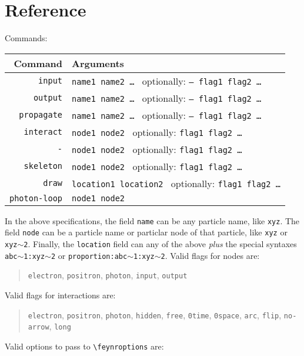 \documentclass[12pt]{article}
\begin{document}
\section*{Reference}
Commands:
\begin{center}
\begin{tabular}{r|l}
	Command & Arguments \\\hline
	\texttt{input} & \texttt{name1 name2 \dots} \ optionally: \texttt{-- flag1 flag2 \dots} \\
	\texttt{output} & \texttt{name1 name2 \dots} \ optionally: \texttt{-- flag1 flag2 \dots} \\
	\texttt{propagate} & \texttt{name1 name2 \dots} \ optionally: \texttt{-- flag1 flag2 \dots} \\
	\texttt{interact} & \texttt{node1 node2} \ optionally: \texttt{flag1 flag2 \dots} \\
	\texttt{-} & \texttt{node1 node2} \ optionally: \texttt{flag1 flag2 \dots} \\
	\texttt{skeleton} & \texttt{node1 node2} \ optionally: \texttt{flag1 flag2 \dots} \\
	\texttt{draw} & \texttt{location1 location2} \ optionally: \texttt{flag1 flag2 \dots} \\
	\texttt{photon-loop} & \texttt{node1 node2}
\end{tabular}
\end{center}
In the above specifications, the field \texttt{name} can be any particle name, like \texttt{xyz}.
The field \texttt{node} can be a particle name or particlar node of that particle, like \texttt{xyz} or \texttt{xyz$\sim$2}.
Finally, the \texttt{location} field can any of the above \emph{plus} the special syntaxes \texttt{abc$\sim$1:xyz$\sim$2} or \texttt{proportion:abc$\sim$1:xyz$\sim$2}.
Valid flags for nodes are:
\begin{quote}
\texttt{electron}, \texttt{positron}, \texttt{photon}, \texttt{input}, \texttt{output}
\end{quote}
Valid flags for interactions are:
\begin{quote}
\texttt{electron}, \texttt{positron}, \texttt{photon}, \texttt{hidden}, \texttt{free}, \texttt{0time}, \texttt{0space}, \texttt{arc}, \texttt{flip}, \texttt{no-arrow}, \texttt{long}
\end{quote}
Valid options to pass to \texttt{\textbackslash{}feynroptions} are:
\end{document}
